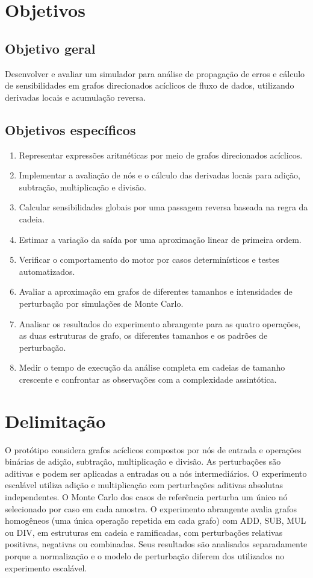 \documentclass[12pt,openright,oneside,a4paper,brazil]{abntex2}
\begin{document}
\section{Objetivos}
\subsection{Objetivo geral}
Desenvolver e avaliar um simulador para análise de propagação de erros e cálculo de sensibilidades em grafos direcionados acíclicos de fluxo de dados, utilizando derivadas locais e acumulação reversa.

\subsection{Objetivos específicos}
\begin{enumerate}[leftmargin=1.25cm]
  \item Representar expressões aritméticas por meio de grafos direcionados acíclicos.
  \item Implementar a avaliação de nós e o cálculo das derivadas locais para adição, subtração, multiplicação e divisão.
  \item Calcular sensibilidades globais por uma passagem reversa baseada na regra da cadeia.
  \item Estimar a variação da saída por uma aproximação linear de primeira ordem.
  \item Verificar o comportamento do motor por casos determinísticos e testes automatizados.
  \item Avaliar a aproximação em grafos de diferentes tamanhos e intensidades de perturbação por simulações de Monte Carlo.
  \item Analisar os resultados do experimento abrangente para as quatro operações, as duas estruturas de grafo, os diferentes tamanhos e os padrões de perturbação.
  \item Medir o tempo de execução da análise completa em cadeias de tamanho crescente e confrontar as observações com a complexidade assintótica.
\end{enumerate}

\section{Delimitação}
O protótipo considera grafos acíclicos compostos por nós de entrada e operações binárias de adição, subtração, multiplicação e divisão. As perturbações são aditivas e podem ser aplicadas a entradas ou a nós intermediários. O experimento escalável utiliza adição e multiplicação com perturbações aditivas absolutas independentes. O Monte Carlo dos casos de referência perturba um único nó selecionado por caso em cada amostra. O experimento abrangente avalia grafos homogêneos (uma única operação repetida em cada grafo) com ADD, SUB, MUL ou DIV, em estruturas em cadeia e ramificadas, com perturbações relativas positivas, negativas ou combinadas. Seus resultados são analisados separadamente porque a normalização e o modelo de perturbação diferem dos utilizados no experimento escalável.
\end{document}
